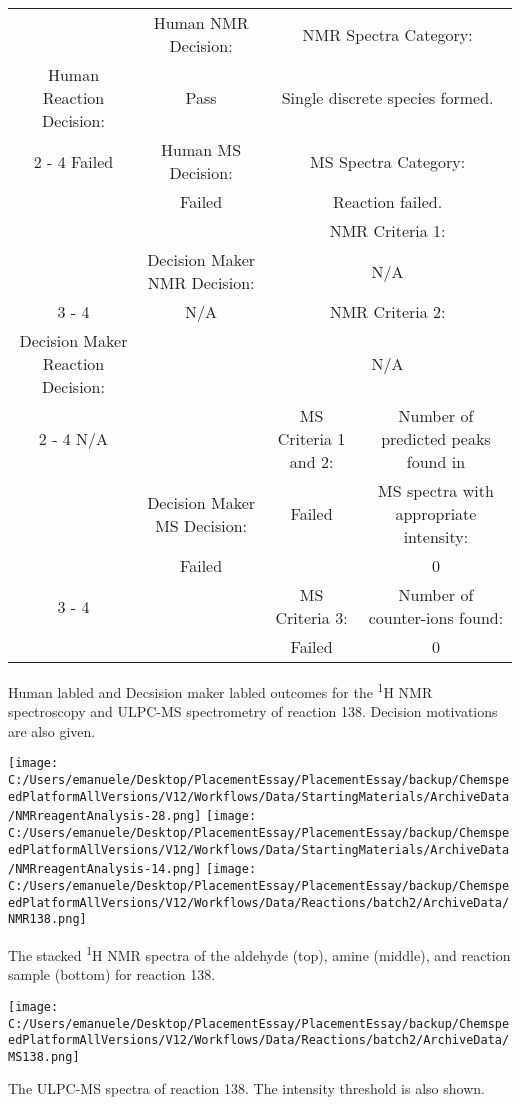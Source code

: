 \documentclass{article}%
\begin{document}
\begin{Decision Table}[H]%
\begin{tabular}{|c|c|c|c|}%
\hline%
&Human NMR Decision:&\multicolumn{2}{|c|}{NMR Spectra Category:}\\%
Human Reaction Decision:&Pass&\multicolumn{2}{|c|}{Single discrete species formed.}\\%
\cline{2%
-%
4}%
Failed&Human MS Decision:&\multicolumn{2}{|c|}{MS Spectra Category:}\\%
&Failed&\multicolumn{2}{|c|}{Reaction failed.}\\%
\hline%
&&\multicolumn{2}{|c|}{NMR Criteria 1:}\\%
&Decision Maker NMR Decision:&\multicolumn{2}{|c|}{N/A}\\%
\cline{3%
-%
4}%
&N/A&\multicolumn{2}{|c|}{NMR Criteria 2:}\\%
Decision Maker Reaction Decision:&&\multicolumn{2}{|c|}{N/A}\\%
\cline{2%
-%
4}%
N/A&&MS Criteria 1 and 2:&Number of predicted peaks found in\\%
&Decision Maker MS Decision:&Failed&MS spectra with appropriate intensity:\\%
&Failed&&0\\%
\cline{3%
-%
4}%
&&MS Criteria 3:&Number of counter{-}ions found:\\%
&&Failed&0\\%
\hline%
\end{tabular}%
\caption{Human labled and Decsision maker labled outcomes for the \textsuperscript{1}H NMR spectroscopy and ULPC-MS spectrometry of reaction 138. Decision motivations are also given.}%
\end{Decision Table}%
\begin{NMR Spectra}[H]%
\begin{center}%
\texttt{[image: C:/Users/emanuele/Desktop/PlacementEssay/PlacementEssay/backup/ChemspeedPlatformAllVersions/V12/Workflows/Data/StartingMaterials/ArchiveData/NMRreagentAnalysis-28.png]}\hfill%
\texttt{[image: C:/Users/emanuele/Desktop/PlacementEssay/PlacementEssay/backup/ChemspeedPlatformAllVersions/V12/Workflows/Data/StartingMaterials/ArchiveData/NMRreagentAnalysis-14.png]}\hfill%
\texttt{[image: C:/Users/emanuele/Desktop/PlacementEssay/PlacementEssay/backup/ChemspeedPlatformAllVersions/V12/Workflows/Data/Reactions/batch2/ArchiveData/NMR138.png]}\hfill%
\end{center}%
\caption{The stacked \textsuperscript{1}H NMR spectra of the aldehyde (top), amine (middle), and reaction sample (bottom) for reaction 138.}%
\end{NMR Spectra}%
\begin{MS Spectra}[H]%
\begin{center}%
\texttt{[image: C:/Users/emanuele/Desktop/PlacementEssay/PlacementEssay/backup/ChemspeedPlatformAllVersions/V12/Workflows/Data/Reactions/batch2/ArchiveData/MS138.png]}\hfill%
\end{center}%
\caption{The ULPC-MS spectra of reaction 138. The intensity threshold is also shown.}%
\end{MS Spectra}%
\end{document}
